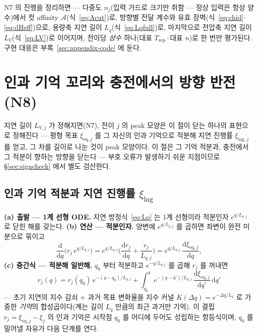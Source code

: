 \documentclass[11pt,a4paper]{article}
\newcommand{\dd}{\mathrm{d}}
\newcommand{\eq}{\mathrm{eq}}
\newcommand{\rep}{\mathrm{rep}}
\begin{document}
N7 의 진행을 정리하면 — 다중도 $n_j$(입력 가드로 크기만 취함 — 정상 입력은 항상 양수)에서 컷 affinity $\mathcal A$(식~\eqref{eq:Acut})로,
방향별 전달 계수와 유효 장벽(식~\eqref{eq:chid}$\cdot$\eqref{eq:dHeff})으로, 용량축 지연 길이
$L_q$(식~\eqref{eq:Lqfull})로, 마지막으로 전압축 지연 길이 $L_V$(식~\eqref{eq:LV})로 이어지며, 전이당
\emph{상수} 하나(대표 $T_\rep\cdot$대표 $n$)로 한 번만 평가된다. 구현 대응은
부록~\ref{sec:appendix-code} 에 둔다.

\section{인과 기억 꼬리와 충전에서의 방향 반전 (N8)}\label{sec:tail}
지연 길이 $L_{V,j}$ 가 정해지면(N7), 전이 $j$ 의 peak 모양은 이 절이 닫는 하나의 표현으로 정해진다 ---
평형 목표 $\xi_{\eq,j}$ 를 그 자신의 인과 기억으로 적분해 지연 진행률 $\xi_{\mathrm{lag},j}$ 를 얻고, 그
차를 길이로 나눈 것이 peak 모양이다. 이 절은 그 기억 적분과, 충전에서 그 적분이 향하는 방향을 닫는다 ---
부호 오류가 발생하기 쉬운 지점이므로 \S\ref{sec:signcheck} 에서 별도 검산한다.

\subsection{인과 기억 적분과 지연 진행률 $\xi_\mathrm{lag}$}
\textbf{(a) 출발 --- 1계 선형 ODE.} 지연 방정식~\eqref{eq:Lq} 는 1계 선형이라 적분인자 $e^{q/L_{q,j}}$ 로
닫힌 해를 갖는다. \textbf{(b) 연산 --- 적분인자.} 양변에 $e^{q/L_{q,j}}$ 를 곱하면 좌변이 완전 미분으로
묶이고
\begin{equation}
\frac{\dd}{\dd q}\Big(r_j\,e^{q/L_{q,j}}\Big)
=e^{q/L_{q,j}}\Big(\frac{\dd r_j}{\dd q}+\frac{r_j}{L_{q,j}}\Big)
=e^{q/L_{q,j}}\,\frac{\dd\xi_{\eq,j}}{\dd q},
\label{eq:intfactor}
\end{equation}
\textbf{(c) 중간식 --- 적분해 일반해.} $q_0$ 부터 적분하고 $e^{-q/L_{q,j}}$ 를 곱해 $r_j$ 를 꺼내면
\begin{equation}
r_j(q)=r_j(q_0)\,e^{-(q-q_0)/L_{q,j}}
+\int_{q_0}^{q}e^{-(q-q')/L_{q,j}}\,\frac{\dd\xi_{\eq,j}}{\dd q'}\,\dd q'
\label{eq:memory}
\end{equation}
--- 초기 지연의 지수 감쇠 $+$ 과거 목표 변화율을 지수 커널 $K(\Delta q)=e^{-\Delta q/L_q}$ 로 가중한
\emph{기억}의 합성곱이다(계는 길이 $L_q$ 만큼의 최근 과거만 기억). 이 결핍 $r_j=\xi_{\eq,j}-\xi_j$
의 인과 기억은 시작점 $q_0$ 를 어디에 두어도 성립하는 항등식이며, $q_0$ 를 밀어낼 자유가 다음
단계를 연다.
\end{document}
